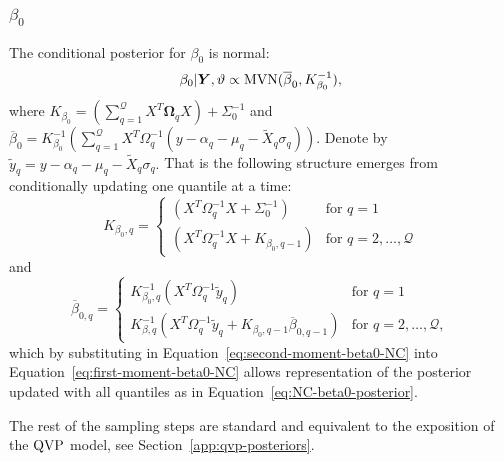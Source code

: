 \subsubsection{$\beta_0$}
The conditional posterior for $\beta_0$ is normal:
%
\begin{equation}
    \beta_0\vert\boldsymbol{Y},\vartheta \propto \mathrm{MVN}(\overline{\beta}_0,K^{-1}_{\beta_0}),
\end{equation}
%
where $K_{\beta_0} = (\sum_{q=1}^{\mathcal{Q}}X^T\boldsymbol{\Omega}_qX) + \Sigma_0^{-1}$ and $\overline{\beta}_0  = K^{-1}_{\beta_0}(\sum_{q=1}^{\mathcal{Q}}X^T\Omega_q^{-1}(y - \alpha_q - \mu_q - \tilde{X}_q\sigma_q))$. Denote by $\tilde{y}_q = y - \alpha_q - \mu_q - \tilde{X}_q\sigma_q.$
%
That is the following structure emerges from conditionally updating one quantile at a time:
%
\begin{equation}\label{eq:second-moment-beta0-NC}
  K_{\beta_0,q} =
  \begin{cases}
    \left( X^T\Omega_q^{-1}X + \Sigma_0^{-1} \right) & \text{for $q = 1$ } \\
    \left( X^T\Omega_q^{-1}X + K_{\beta_0,q-1}  \right) & \text{for $q = 2,\dotsc,\mathcal{Q}$}
  \end{cases}
\end{equation}
%
and 
%
\begin{equation}\label{eq:first-moment-beta0-NC}
  \overline{\beta}_{0,q} =
  \begin{cases}
    K^{-1}_{\beta_0,q} \left( X^T\Omega_q^{-1}\tilde{y}_q \right) & \text{for $q = 1$ } \\
    K^{-1}_{\beta,q} \left( X^T\Omega_q^{-1}\tilde{y}_q + K_{\beta_0,q-1}\overline{\beta}_{0,q-1} \right) & \text{for $q = 2,\dotsc,\mathcal{Q}$},
  \end{cases}
\end{equation}
which by substituting in Equation~\ref{eq:second-moment-beta0-NC} into Equation~\ref{eq:first-moment-beta0-NC} allows representation of the posterior updated with all quantiles as in Equation~\ref{eq:NC-beta0-posterior}.
%

The rest of the sampling steps are standard and equivalent to the exposition of the $\operatorname{QVP}$ model, see Section~\ref{app:qvp-posteriors}.

